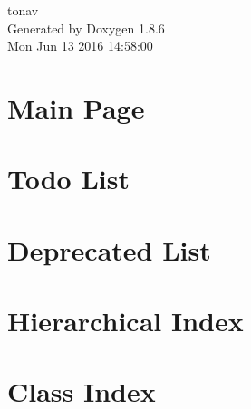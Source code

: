\documentclass[twoside]{book}
\newcommand{\clearemptydoublepage}{%
  \newpage{\pagestyle{empty}\cleardoublepage}%
}
\begin{document}
\hypersetup{pageanchor=false}
\begin{titlepage}
\vspace*{7cm}
\begin{center}%
{\Large tonav }\\
\vspace*{1cm}
{\large Generated by Doxygen 1.8.6}\\
\vspace*{0.5cm}
{\small Mon Jun 13 2016 14:58:00}\\
\end{center}
\end{titlepage}
\clearemptydoublepage
\tableofcontents
\clearemptydoublepage
{}
\hypersetup{pageanchor=true}

\chapter{Main Page}
\label{index}\hypertarget{index}{}
\chapter{Todo List}
\label{todo}
\hypertarget{todo}{}

\chapter{Deprecated List}
\label{deprecated}
\hypertarget{deprecated}{}

\chapter{Hierarchical Index}

\chapter{Class Index}

\end{document}
